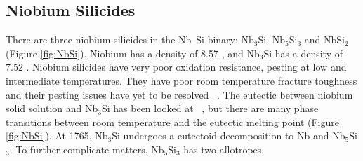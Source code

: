 \subsection{Niobium Silicides}
There are three niobium silicides in the Nb--Si binary: Nb$_3$Si, Nb$_5$Si$_3$ and NbSi$_2$ (Figure \ref{fig:NbSi}). Niobium has a density of 8.57 \gram\usk\centi\rpcubic\meter, and Nb$_3$Si has a density of 7.52 \gram\usk\centi\rpcubic\meter. Niobium silicides have very poor oxidation resistance, pesting at low and intermediate temperatures. They have poor room temperature fracture toughness and their pesting issues have yet to be resolved ~\cite{fleischer87,fleischer94, sauthoff88, shah92}. The eutectic between niobium solid solution and Nb$_3$Si has been looked at ~\cite{kimura05}, but there are many phase transitions between room temperature and the eutectic melting point (Figure \ref{fig:NbSi}). At 1765\celsius, Nb$_3$Si undergoes a eutectoid decomposition to Nb and Nb$_5$Si$_3$.  To further complicate matters, Nb$_5$Si$_3$ has two allotropes.

